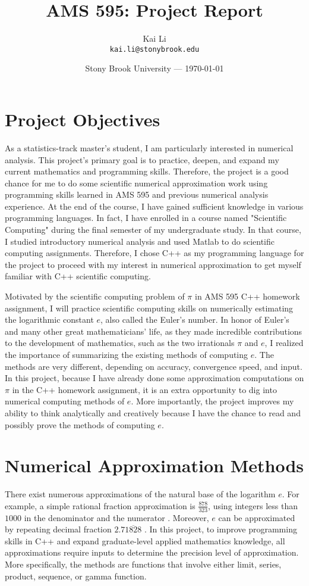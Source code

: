 \documentclass[11pt]{article}
\title{AMS 595: Project Report}
\author{Kai Li\\ \texttt{kai.li@stonybrook.edu}}
\date{Stony Brook University --- \today}
\begin{document}
\maketitle

\section{Project Objectives}

As a statistics-track master's student, I am particularly interested in numerical analysis. This project's primary goal is to practice, deepen, and expand my current mathematics and programming skills. Therefore, the project is a good chance for me to do some scientific numerical approximation work using programming skills learned in AMS 595 and previous numerical analysis experience. At the end of the course, I have gained sufficient knowledge in various programming languages. In fact, I have enrolled in a course named "Scientific Computing" during the final semester of my undergraduate study. In that course, I studied introductory numerical analysis and used Matlab to do scientific computing assignments. Therefore, I chose C++ as my programming language for the project to proceed with my interest in numerical approximation to get myself familiar with C++ scientific computing.

Motivated by the scientific computing problem of $\pi$ in AMS 595 C++ homework assignment, I will practice scientific computing skills on numerically estimating the logarithmic constant $e$, also called the Euler's number. In honor of Euler's and many other great mathematicians' life, as they made incredible contributions to the development of mathematics, such as the two irrationals $\pi$ and $e$, I realized the importance of summarizing the existing methods of computing $e$. The methods are very different, depending on accuracy, convergence speed, and input. In this project, because I have already done some approximation computations on $\pi$ in the C++ homework assignment, it is an extra opportunity to dig into numerical computing methods of $e$. More importantly, the project improves my ability to think analytically and creatively because I have the chance to read and possibly prove the methods of computing $e$.

\section{Numerical Approximation Methods}
There exist numerous approximations of the natural base of the logarithm $e$. For example, a simple rational fraction approximation is $\frac{878}{323}$, using integers less than $1000$ in the denominator and the numerator \cite{bk:maor}. Moreover, $e$ can be approximated by repeating decimal fraction $2.7\overline{1828}$ \cite{ar:brown}. In this project, to improve programming skills in C++ and expand graduate-level applied mathematics knowledge, all approximations require inputs to determine the precision level of approximation. More specifically, the methods are functions that involve either limit, series, product, sequence, or gamma function. 
\end{document}
